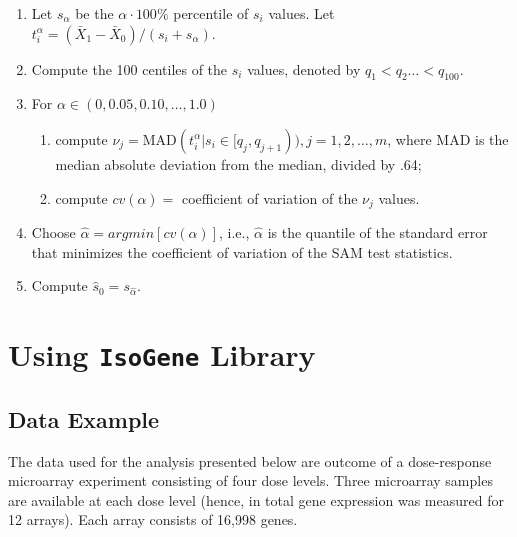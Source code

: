 \begin{enumerate}

\item Let $s_{\alpha}$ be the $\alpha \cdot 100\%$ percentile of $s_i$ values.
Let $t_i^{\alpha}= (\bar{X}_{1}-\bar{X}_{0})/(s_i+s_{\alpha})$.

\item Compute the 100 centiles of the $s_i$ values, denoted by $q_1 <
q_2\dots < q_{100}$.

\item For $\alpha \in (0, 0.05, 0.10, \dots, 1.0)$

\begin{enumerate}

\item compute $\nu_j= \mbox{MAD}(t_i^{\alpha}|s_i \in
[q_j,q_{j+1})),j=1,2,\dots,m$, where \mbox{MAD} is the median
absolute deviation from the median, divided by .64;

\item compute $cv(\alpha)=$ coefficient of variation of the $\nu_j$
values.

\end{enumerate}

\item Choose $\hat{\alpha}=argmin[cv(\alpha)]$, i.e.,
$\hat{\alpha}$ is the quantile of the standard error that minimizes
the coefficient of variation of the SAM test statistics.

\item Compute $\hat{s}_0=s_{\hat{\alpha}}$.

\end{enumerate}




\section{Using \texttt{IsoGene} Library}

\subsection{Data Example}

The data used for the analysis presented below are outcome of a dose-response microarray experiment
consisting of four dose levels. Three microarray samples are available at each dose level (hence, in total
gene expression was measured for 12 arrays). Each array consists of 16,998 genes.

